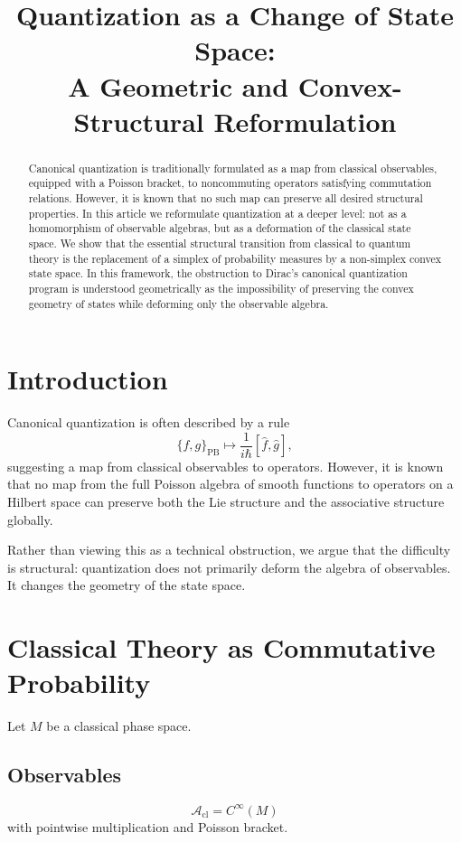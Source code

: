 \documentclass[11pt]{article}
\title{Quantization as a Change of State Space:\\
A Geometric and Convex-Structural Reformulation}
\author{}
\date{}
\begin{document}
\maketitle

\begin{abstract}
Canonical quantization is traditionally formulated as a map from classical observables,
equipped with a Poisson bracket, to noncommuting operators satisfying commutation relations.
However, it is known that no such map can preserve all desired structural properties.
In this article we reformulate quantization at a deeper level:
not as a homomorphism of observable algebras,
but as a deformation of the classical state space.
We show that the essential structural transition from classical to quantum theory
is the replacement of a simplex of probability measures by a non-simplex convex state space.
In this framework, the obstruction to Dirac's canonical quantization program
is understood geometrically as the impossibility of preserving the convex geometry
of states while deforming only the observable algebra.
\end{abstract}

\section{Introduction}

Canonical quantization is often described by a rule
\begin{equation}
\{f,g\}_{\mathrm{PB}} \longmapsto \frac{1}{i\hbar} [\hat f,\hat g],
\end{equation}
suggesting a map from classical observables to operators.
However, it is known that no map from the full Poisson algebra of smooth functions
to operators on a Hilbert space can preserve
both the Lie structure and the associative structure globally.

Rather than viewing this as a technical obstruction,
we argue that the difficulty is structural:
quantization does not primarily deform the algebra of observables.
It changes the geometry of the state space.

\section{Classical Theory as Commutative Probability}

Let $M$ be a classical phase space.

\subsection*{Observables}
\[
\mathcal{A}_{\mathrm{cl}} = C^\infty(M)
\]
with pointwise multiplication and Poisson bracket.
\end{document}
